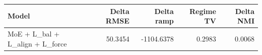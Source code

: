 \begin{tabular}{lrrrr}
\toprule
Model & Delta RMSE & Delta ramp & Regime TV & Delta NMI \\
\midrule
MoE + L\_bal + L\_align + L\_force & 50.3454 & -1104.6378 & 0.2983 & 0.0068 \\
\bottomrule
\end{tabular}
